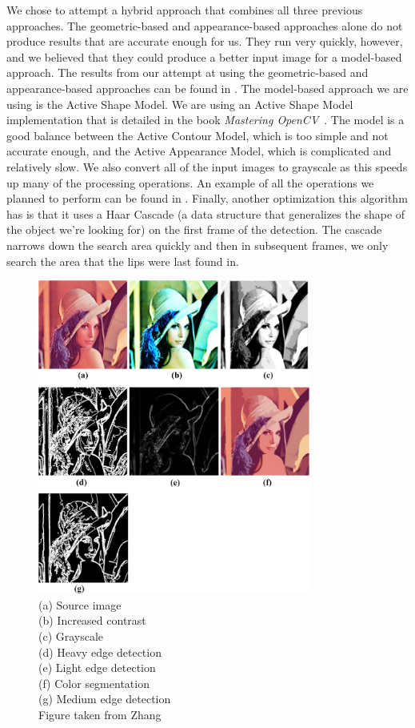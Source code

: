 We chose to attempt a hybrid approach that combines all three previous approaches. The geometric-based and appearance-based approaches alone do not produce results that are accurate enough for us. They run very quickly, however, and we believed that they could produce a better input image for a model-based approach. The results from our attempt at using the geometric-based and appearance-based approaches can be found in . The model-based approach we are using is the Active Shape Model. We are using an Active Shape Model implementation that is detailed in the book \textit{Mastering OpenCV}~\cite{mastering-opencv}.
The model is a good balance between the Active Contour Model, which is too simple and not accurate enough, and the Active Appearance Model, which is complicated and relatively slow. We also convert all of the input images to grayscale as this speeds up many of the processing operations. An example of all the operations we planned to perform can be found in . 
Finally, another optimization this algorithm has is that it uses a Haar Cascade (a data structure that generalizes the shape of the object we're looking for) on the first frame of the detection. The cascade narrows down the search area quickly and then in subsequent frames, we only search the area that the lips were last found in.

\begin{figure}[p]
    \centering
    \includegraphics[width=0.8\textwidth]{diagrams/lena.png}
    \caption[Image filters]{(a) Source image\\(b) Increased contrast\\(c) Grayscale\\(d) Heavy edge detection\\
	(e) Light edge detection\\(f) Color segmentation\\(g) Medium edge detection\\Figure taken from Zhang\cite{filters}}
    \label{fig:lena}
\end{figure}